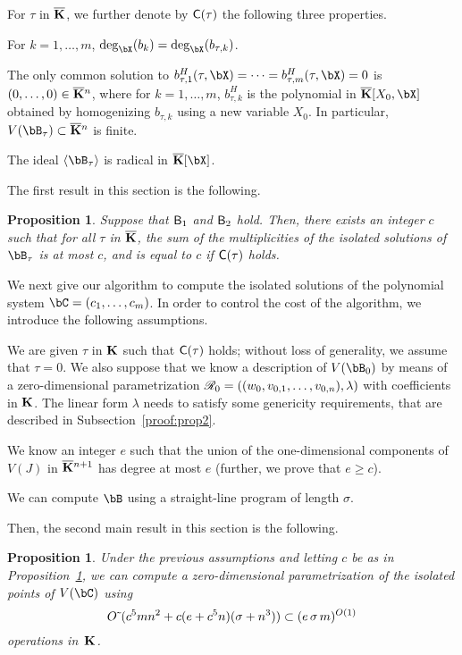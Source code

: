\documentclass[12pt]{article}
\newtheorem{proposition}[definition]{Proposition}
\begin{document}
For $\tau$ in $\overline{\mathbf{K}}$, we further denote by $\mathsf{C}(\tau)$ the
following three properties.
\begin{description}[leftmargin=*]
\item[$\assG_1(\tau).$] For $k=1,\dots,m$,
  $\deg_\bX(b_k)=\deg_\bX(b_{\tau,k})$.
\item[$\assG_2(\tau).$] The only common solution to
  $b_{\tau,1}^H(\tau,\bX)=\cdots=b_{\tau,m}^H(\tau,\bX)=0$ is
  $(0,\dots,0)\in\overline{\mathbf{K}}{}^n$, where for $k=1,\dots,m$, $b_{\tau,k}^H$ is
  the polynomial in $\KKbar[X_0,\bX]$ obtained by homogenizing
  $b_{\tau,k}$ using a new variable $X_0$. In particular, $V(\bB_\tau)
  \subset \KKbar{}^n$ is finite.
\item[$\assG_3(\tau).$] The ideal $\langle \bB_\tau \rangle$ is
  radical in $\KKbar[\bX]$.
\end{description}

The first result in this section is the following.
\begin{proposition}\label{prop:degree_fiber}
  Suppose that $\mathsf{B}_1$ and $\mathsf{B}_2$ hold. Then, there exists an
  integer $c$ such that for all $\tau$ in $\overline{\mathbf{K}}$, the sum of the
  multiplicities of the isolated solutions of $\bB_\tau$ is at most
  $c$, and is equal to $c$ if $\mathsf{C}(\tau)$ holds.
\end{proposition}


We next give our algorithm to compute the isolated solutions of the
polynomial system $\bC=(c_1,\dots,c_m)$. In order to control the cost
of the algorithm, we introduce the following assumptions.
\begin{description}[leftmargin=*]
\item[${\assD}_1$.] We are given $\tau$ in $\mathbf{K}$ such that $\mathsf{C}(\tau)$
  holds; without loss of generality, we assume that $\tau=0$. We also
  suppose that we know a description of $V(\bB_{0})$ by means of a
  zero-dimensional parametrization  $\mathscr{R}_0 =((w_{0},v_{0,1},\dots,v_{0,n}),\lambda)$ with
  coefficients in $\mathbf{K}$. The linear form $\lambda$ needs to satisfy
  some genericity requirements, that are described in
  Subsection~\ref{proof:prop2}.
\item[${\assD}_2$.] We know an integer $e$ such that the union of the
  one-dimensional components of $V(J)$ in $\overline{\mathbf{K}}{}^{n+1}$ has degree
  at most $e$ (further, we prove that $e \ge c$).
\item[${\assD}_3$.] We can compute $\bB$ using a straight-line program
  of length $\sigma$.
\end{description}
Then, the second main result in this section is the following.
\begin{proposition}\label{prop:compute_isolated}
  Under the previous assumptions and letting $c$ be as in
  Proposition~\ref{prop:degree_fiber}, we can compute a
  zero-dimensional parametrization of the isolated points of $V(\bC)$
  using
$${O}{\,\tilde{ }\,}(c^5 m n^2  + c(e+c^5 n)(\sigma + n^3)) \subset (e\,\sigma\,m)^{O(1)}$$ operations in~$\mathbf{K}$.
\end{proposition}
\end{document}
